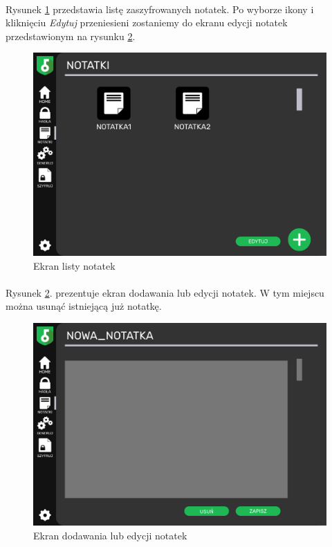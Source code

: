 \documentclass[a4paper]{article}
\begin{document}
\paragraph{}Rysunek \ref{fig:notatki} przedstawia listę zaszyfrowanych notatek. Po wyborze ikony i kliknięciu \textit{Edytuj} przeniesieni zostaniemy do ekranu edycji notatek przedstawionym na rysunku \ref{fig:notatkiNowe}.
\begin{figure}[H]
    \centering
    \includegraphics[width=1\textwidth]{img/ekran_notatek.png}
    \caption{Ekran listy notatek}
    \label{fig:notatki}
\end{figure}

\newpage

\paragraph{}Rysunek \ref{fig:notatkiNowe}. prezentuje ekran dodawania lub edycji notatek. W tym miejscu można usunąć istniejącą już notatkę.
\begin{figure}[H]
    \centering
    \includegraphics[width=1\textwidth]{img/ekran_notatek_nowa.png}
    \caption{Ekran dodawania lub edycji notatek}
    \label{fig:notatkiNowe}
\end{figure}
\end{document}
